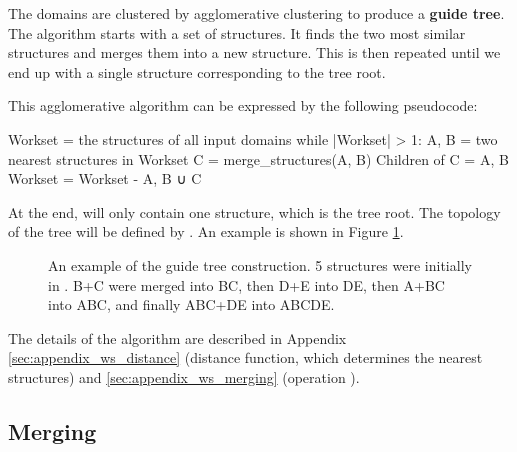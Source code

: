 \documentclass{article}
\begin{document}
The domains are clustered by agglomerative clustering to produce a \textbf{guide
tree}. The algorithm starts with a set of structures. It finds the two 
most similar structures and merges them into a new structure. This is then
repeated until we end up with a single structure corresponding
to the tree root.

This agglomerative algorithm can be expressed by the following
pseudocode:

\begin{codeblock}
    Workset = { the structures of all input domains }  
    while |Workset| > 1:  
        A, B = two nearest structures in Workset
        C = merge_structures(A, B)  
        Children of C = {A, B}
        Workset = Workset - {A, B} ∪ {C}
\end{codeblock}

At the end,  will only contain one structure,
which is the tree root. The topology of the tree will be defined by
. An example is shown in Figure \ref{fig:guide_tree}.

\begin{figure}[h!]
  \caption{An example of the guide tree construction. 5 structures were initially in .
  B+C were merged into BC, then D+E into DE, then A+BC into ABC, and finally ABC+DE into ABCDE.}
  \label{fig:guide_tree}
\end{figure}

The details of the algorithm are described in Appendix \ref{sec:appendix_ws_distance} 
(distance function, which determines the nearest structures) 
and \ref{sec:appendix_ws_merging} (operation ).



\subsection{Merging}
\end{document}
